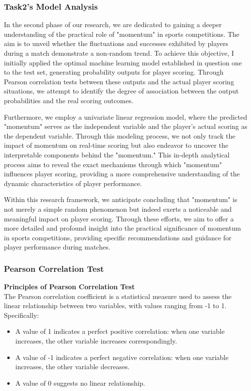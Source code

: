 \documentclass{article}
\begin{document}
\subsubsection{Task2's Model Analysis}
In the second phase of our research, we are dedicated to gaining a deeper understanding of the practical role of "momentum" in sports competitions. The aim is to unveil whether the fluctuations and successes exhibited by players during a match demonstrate a non-random trend. 
To achieve this objective, I initially applied the optimal machine learning model established in question one to the test set, generating probability outputs for player scoring. Through Pearson correlation tests between these outputs and the actual player scoring situations, 
we attempt to identify the degree of association between the output probabilities and the real scoring outcomes.

Furthermore, we employ a univariate linear regression model, where the predicted "momentum" serves as the independent variable and the player's actual scoring as the dependent variable. Through this modeling process, we not only track the impact of momentum on real-time scoring 
but also endeavor to uncover the interpretable components behind the "momentum." This in-depth analytical process aims to reveal the exact mechanisms through which "momentum" influences player scoring, providing a more comprehensive understanding of the dynamic characteristics of player performance.

Within this research framework, we anticipate concluding that "momentum" is not merely a simple random phenomenon but indeed exerts a noticeable and meaningful impact on player scoring. Through these efforts, we aim to offer a more detailed and profound insight into the practical significance 
of momentum in sports competitions, providing specific recommendations and guidance for player performance during matches.
\subsubsection{Pearson Correlation Test}
\textbf{Principles of Pearson Correlation Test}\\

The Pearson correlation coefficient is a statistical measure used to assess the linear relationship between two variables, with values ranging from -1 to 1. Specifically:

\begin{itemize}
  \item A value of 1 indicates a perfect positive correlation: when one variable increases, the other variable increases correspondingly.
  \item A value of -1 indicates a perfect negative correlation: when one variable increases, the other variable decreases.
  \item A value of 0 suggests no linear relationship.
\end{itemize}
\end{document}
